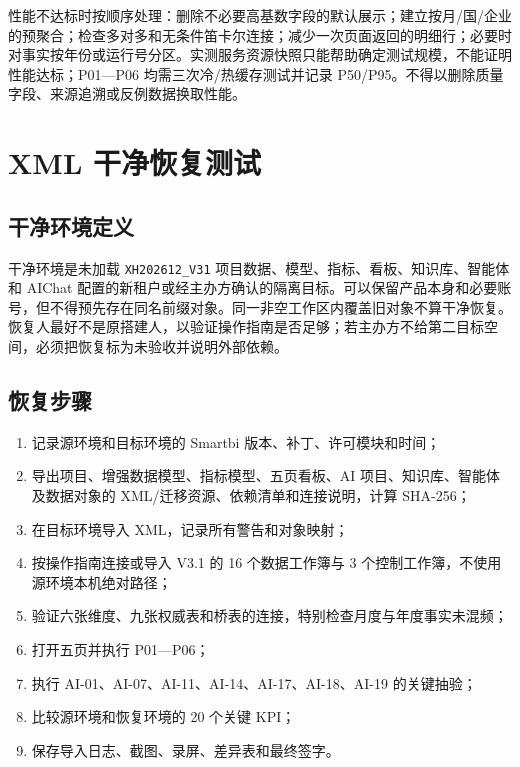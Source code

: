 \documentclass[UTF8,fontset=windows,12pt,openany]{ctexbook}
\newcommand{\Field}[1]{{\small\nolinkurl{#1}}}
\begin{document}
性能不达标时按顺序处理：删除不必要高基数字段的默认展示；建立按月/国/企业的预聚合；检查多对多和无条件笛卡尔连接；减少一次页面返回的明细行；必要时对事实按年份或运行号分区。实测服务资源快照只能帮助确定测试规模，不能证明性能达标；P01—P06 均需三次冷/热缓存测试并记录 P50/P95。不得以删除质量字段、来源追溯或反例数据换取性能。

\chapter{XML 干净恢复测试}

\section{干净环境定义}

干净环境是未加载 \Field{XH202612_V31} 项目数据、模型、指标、看板、知识库、智能体和 AIChat 配置的新租户或经主办方确认的隔离目标。可以保留产品本身和必要账号，但不得预先存在同名前缀对象。同一非空工作区内覆盖旧对象不算干净恢复。恢复人最好不是原搭建人，以验证操作指南是否足够；若主办方不给第二目标空间，必须把恢复标为未验收并说明外部依赖。

\section{恢复步骤}

\begin{enumerate}
  \item 记录源环境和目标环境的 Smartbi 版本、补丁、许可模块和时间；
  \item 导出项目、增强数据模型、指标模型、五页看板、AI 项目、知识库、智能体及数据对象的 XML/迁移资源、依赖清单和连接说明，计算 SHA-256；
  \item 在目标环境导入 XML，记录所有警告和对象映射；
  \item 按操作指南连接或导入 V3.1 的 16 个数据工作簿与 3 个控制工作簿，不使用源环境本机绝对路径；
  \item 验证六张维度、九张权威表和桥表的连接，特别检查月度与年度事实未混频；
  \item 打开五页并执行 P01—P06；
  \item 执行 AI-01、AI-07、AI-11、AI-14、AI-17、AI-18、AI-19 的关键抽验；
  \item 比较源环境和恢复环境的 20 个关键 KPI；
  \item 保存导入日志、截图、录屏、差异表和最终签字。
\end{enumerate}
\end{document}
